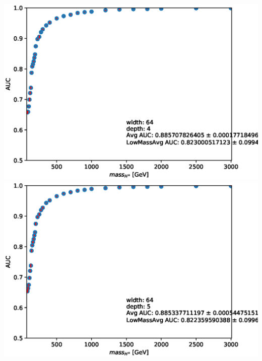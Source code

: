 \documentclass[aspectratio=169,xcolor=table]{beamer}
\begin{document}
\begin{frame}
\begin{columns}
      \includegraphics[height=.25\textheight,keepaspectratio=true]{AUC_Plots/model_GB_1024_channel_taulep_mass_80to3000_ntracks_1_nfolds_5_fold_4_nvars_19_batch_size_1024_epochs_1000_dense_layer_size_64_activation_function_LeakyRelu_depth_4_loss_binary_crossentropy_dropout_0.1_alpha_0.05.eps}
      \includegraphics[height=.25\textheight,keepaspectratio=true]{AUC_Plots/model_GB_1024_channel_taulep_mass_80to3000_ntracks_1_nfolds_5_fold_4_nvars_19_batch_size_1024_epochs_1000_dense_layer_size_64_activation_function_LeakyRelu_depth_5_loss_binary_crossentropy_dropout_0.1_alpha_0.05.eps}


\end{columns}
\end{frame}
\end{document}
